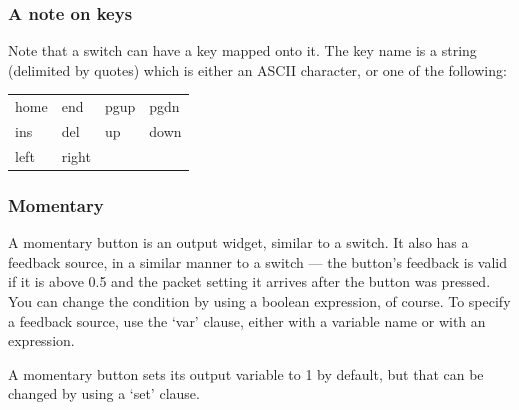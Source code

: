 \subsubsection{A note on keys}
Note that a switch can have a key mapped onto it. The key name is a string (delimited by quotes)
which is either an ASCII character, or one of the following:

\begin{center}
\begin{tabular}{llll}
home & end & pgup & pgdn \\
ins & del & up & down \\
left & right & \\
\end{tabular}
\end{center}


\subsubsection{Momentary}
\label{moms}
A momentary button is an output widget, similar to a switch. It also has a
feedback source, in a similar manner to a switch --- the button's feedback is
valid if it is above 0.5 and the packet setting it arrives after the button
was pressed. You can change the condition by using a boolean expression, of course.
To specify a feedback source, use the `var' clause, either with a variable name
or with an expression.

A momentary button sets its output variable to 1 by default, but that can be changed
by using a `set' clause.

